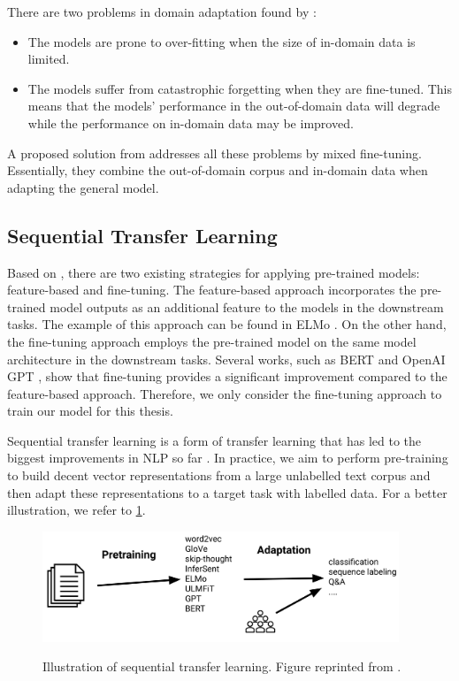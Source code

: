 There are two problems in domain adaptation found by :
\begin{itemize}
    \item The models are prone to over-fitting when the size of in-domain data is limited.
    \item The models suffer from catastrophic forgetting when they are fine-tuned. This means that the models' performance in the out-of-domain data will degrade while the performance on in-domain data may be improved.
\end{itemize}
A proposed solution from  addresses all these problems by mixed fine-tuning. Essentially, they combine the out-of-domain corpus and in-domain data when adapting the general model.

\subsection{Sequential Transfer Learning}
Based on , there are two existing strategies for applying pre-trained models: feature-based and fine-tuning. The feature-based approach incorporates the pre-trained model outputs as an additional feature to the models in the downstream tasks. The example of this approach can be found in ELMo . On the other hand, the fine-tuning approach employs the pre-trained model on the same model architecture in the downstream tasks. Several works, such as BERT  and OpenAI GPT , show that fine-tuning provides a significant improvement compared to the feature-based approach. Therefore, we only consider the fine-tuning approach to train our model for this thesis.

Sequential transfer learning is a form of transfer learning that has led to the biggest improvements in NLP so far . In practice, we aim to perform pre-training to build decent vector representations from a large unlabelled text corpus and then adapt these representations to a target task with labelled data. For a better illustration, we refer to \cref{img:seq_tl}.

\begin{figure}[h]
    {\includegraphics[width=0.95\textwidth]{img/sequential_tl.png}}
    \centering
    \caption{Illustration of sequential transfer learning. Figure reprinted from .}
    \label{img:seq_tl}
\end{figure}

